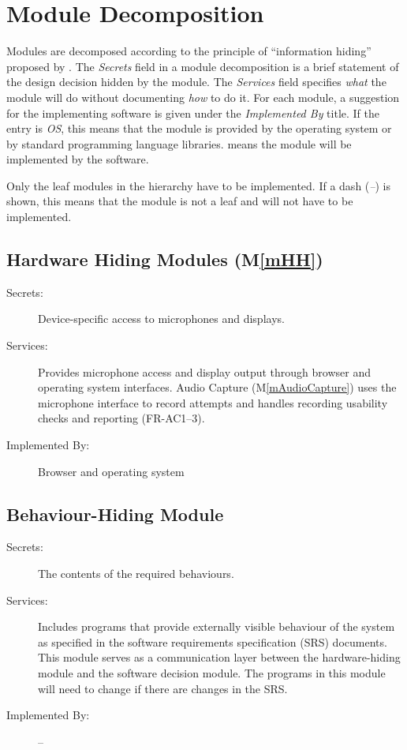 \documentclass[12pt, titlepage]{article}
\newcommand{\mref}[1]{M\ref{#1}}
\begin{document}
\section{Module Decomposition} \label{SecMD}

Modules are decomposed according to the principle of ``information hiding''
proposed by \citet{ParnasEtAl1984}. The \emph{Secrets} field in a module
decomposition is a brief statement of the design decision hidden by the
module. The \emph{Services} field specifies \emph{what} the module will do
without documenting \emph{how} to do it. For each module, a suggestion for the
implementing software is given under the \emph{Implemented By} title. If the
entry is \emph{OS}, this means that the module is provided by the operating
system or by standard programming language libraries.  \emph{\progname{}} means the
module will be implemented by the \progname{} software.

Only the leaf modules in the hierarchy have to be implemented. If a dash
(\emph{--}) is shown, this means that the module is not a leaf and will not have
to be implemented.

\subsection{Hardware Hiding Modules (\mref{mHH})}

\begin{description}
\item[Secrets:] Device-specific access to microphones and displays.
\item[Services:] Provides microphone access and display output through
browser and operating system interfaces. Audio Capture (\mref{mAudioCapture})
uses the microphone interface to record attempts and handles recording
usability checks and reporting (FR-AC1--3).
\item[Implemented By:] Browser and operating system
\end{description}

\subsection{Behaviour-Hiding Module}

\begin{description}
\item[Secrets:]The contents of the required behaviours.
\item[Services:]Includes programs that provide externally visible behaviour of
  the system as specified in the software requirements specification (SRS)
  documents. This module serves as a communication layer between the
  hardware-hiding module and the software decision module. The programs in this
  module will need to change if there are changes in the SRS.
\item[Implemented By:] --
\end{description}
\end{document}

